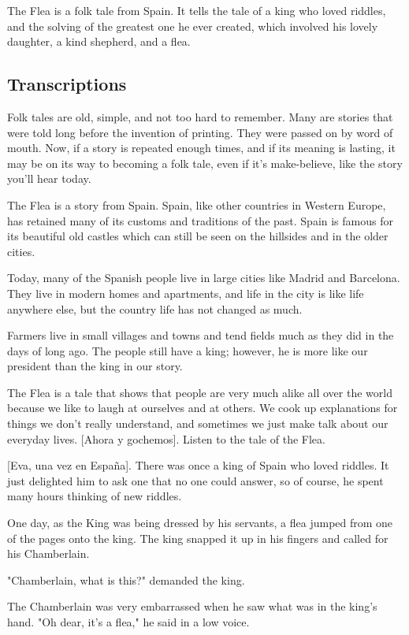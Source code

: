 The Flea is a folk tale from Spain.
It tells the tale of a king who loved riddles, and the solving of the greatest one he ever created, which involved his lovely daughter, a kind shepherd, and a flea.

\subsection{Transcriptions}

Folk tales are old, simple, and not too hard to remember. Many are stories that were told long before the invention of printing. They were passed on by word of mouth. Now, if a story is repeated enough times, and if its meaning is lasting, it may be on its way to becoming a folk tale, even if it's make-believe, like the story you'll hear today.

The Flea is a story from Spain. Spain, like other countries in Western Europe, has retained many of its customs and traditions of the past. Spain is famous for its beautiful old castles which can still be seen on the hillsides and in the older cities.

Today, many of the Spanish people live in large cities like Madrid and Barcelona. They live in modern homes and apartments, and life in the city is like life anywhere else, but the country life has not changed as much.

Farmers live in small villages and towns and tend fields much as they did in the days of long ago. The people still have a king; however, he is more like our president than the king in our story.

The Flea is a tale that shows that people are very much alike all over the world because we like to laugh at ourselves and at others. We cook up explanations for things we don't really understand, and sometimes we just make talk about our everyday lives. [Ahora y gochemos]. Listen to the tale of the Flea.

    [Eva, una vez en España]. There was once a king of Spain who loved riddles. It just delighted him to ask one that no one could answer, so of course, he spent many hours thinking of new riddles.

One day, as the King was being dressed by his servants, a flea jumped from one of the pages onto the king. The king snapped it up in his fingers and called for his Chamberlain.

"Chamberlain, what is this?" demanded the king.

The Chamberlain was very embarrassed when he saw what was in the king's hand. "Oh dear, it's a flea," he said in a low voice.

